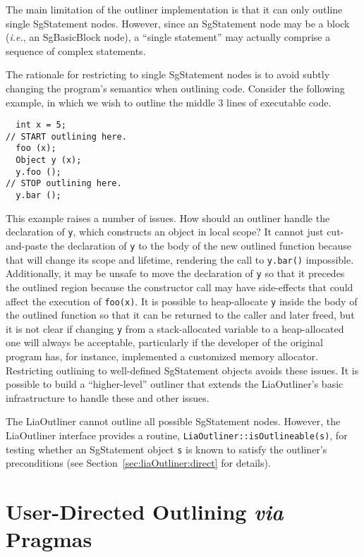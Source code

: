 The main limitation of the outliner implementation is that it can only
outline single SgStatement nodes. However, since an SgStatement node
may be a block (\emph{i.e.}, an SgBasicBlock node), a ``single
statement'' may actually comprise a sequence of complex statements.

The rationale for restricting to single SgStatement nodes is to avoid
subtly changing the program's semantics when outlining code. Consider
the following example, in which we wish to outline the middle 3 lines
of executable code.
%
\lstset{language=C++,numbers=left,firstnumber=1,stepnumber=2}
\begin{lstlisting}
  int x = 5;
// START outlining here.
  foo (x);
  Object y (x);
  y.foo ();
// STOP outlining here.
  y.bar ();
\end{lstlisting}
%
This example raises a number of issues. How should an outliner handle
the declaration of \texttt{y}, which constructs an object in local
scope? It cannot just cut-and-paste the declaration of \texttt{y} to
the body of the new outlined function because that will change its
scope and lifetime, rendering the call to \texttt{y.bar()}
impossible. Additionally, it may be unsafe to move the declaration of
\texttt{y} so that it precedes the outlined region because the
constructor call may have side-effects that could affect the execution
of \texttt{foo(x)}. It is possible to heap-allocate \texttt{y} inside
the body of the outlined function so that it can be returned to the
caller and later freed, but it is not clear if changing \texttt{y}
from a stack-allocated variable to a heap-allocated one will always be
acceptable, particularly if the developer of the original program has,
for instance, implemented a customized memory allocator. Restricting
outlining to well-defined SgStatement objects avoids these issues.  It
is possible to build a ``higher-level'' outliner that extends the
LiaOutliner's basic infrastructure to handle these and other issues.

The LiaOutliner cannot outline all possible SgStatement nodes.
However, the LiaOutliner interface provides a routine,
\texttt{LiaOutliner::isOutlineable(s)}, for testing whether an
SgStatement object \texttt{s} is known to satisfy the outliner's
preconditions (see Section~\ref{sec:liaOutliner:direct} for details).

\section{User-Directed Outlining \emph{via} Pragmas}
\label{sec:liaOutliner:basic}

